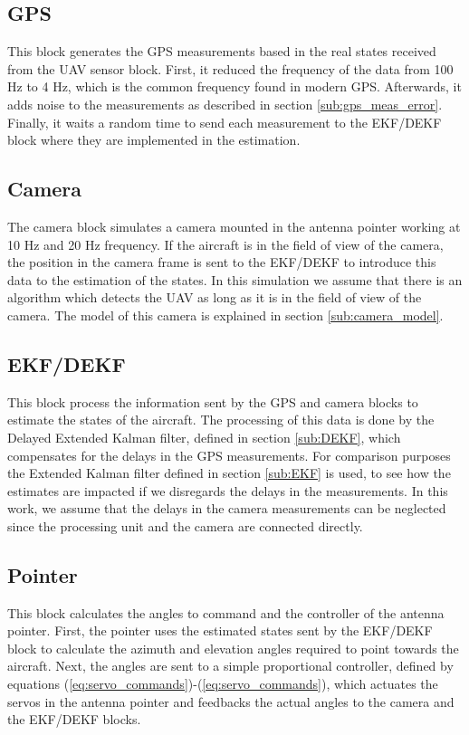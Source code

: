 \subsection{GPS}
This block generates the GPS measurements based in the real states received from the UAV sensor block. First, it reduced the frequency of the data from 100 Hz to 4 Hz, which is the common frequency found in modern GPS. Afterwards, it adds noise to the measurements as described in section \ref{sub:gps_meas_error}. Finally, it waits a random time to send each measurement to the EKF/DEKF block where they are implemented in the estimation.
\pagebreak
\subsection{Camera}
The camera block simulates a camera mounted in the antenna pointer working at 10 Hz and 20 Hz frequency. If the aircraft is in the field of view of the camera, the position in the camera frame is sent to the EKF/DEKF to introduce this data to the estimation of the states. In this simulation we assume that there is an algorithm which detects the UAV as long as it is in the field of view of the camera. The model of this camera is explained in section \ref{sub:camera_model}.

\subsection{EKF/DEKF}
This block process the information sent by the GPS and camera blocks to estimate the states of the aircraft. The processing of this data is done by the Delayed Extended Kalman filter, defined in section \ref{sub:DEKF}, which compensates for the delays in the GPS measurements. For comparison purposes the Extended Kalman filter defined in section \ref{sub:EKF} is used, to see how the estimates are impacted if we disregards the delays in the measurements.
In this work, we assume that the delays in the camera measurements can be neglected since the processing unit and the camera are connected directly.  

\subsection{Pointer}
This block calculates the angles to command and the controller of the antenna pointer. First, the pointer uses the estimated states sent by the EKF/DEKF block to calculate the azimuth and elevation angles required to point towards the aircraft. Next, the angles are sent to a simple proportional controller, defined by equations (\ref{eq:servo_commands})-(\ref{eq:servo_commands}), which actuates the servos in the antenna pointer and feedbacks the actual angles to the camera and the EKF/DEKF blocks. 
\pagebreak
